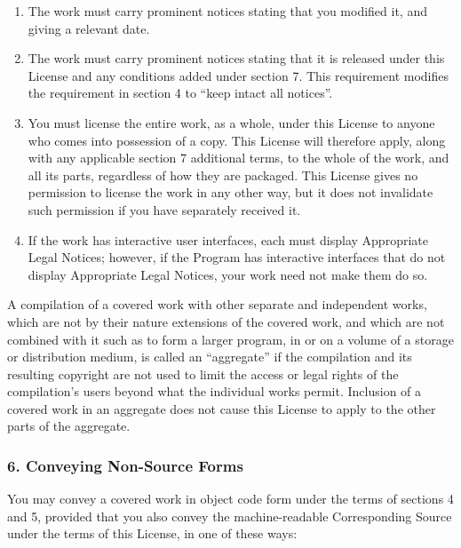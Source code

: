 \documentclass[a4paper, 11pt, twoside]{article}
\begin{document}
\begin{enumerate}[label=\Alph*)]
\item The work must carry prominent notices stating that you modified it, and giving a relevant date.
\item The work must carry prominent notices stating that it is released under this License and any conditions added under section 7. This requirement modifies the requirement in section 4 to “keep intact all notices”.
\item You must license the entire work, as a whole, under this License to anyone who comes into possession of a copy. This License will therefore apply, along with any applicable section 7 additional terms, to the whole of the work, and all its parts, regardless of how they are packaged. This License gives no permission to license the work in any other way, but it does not invalidate such permission if you have separately received it.
\item If the work has interactive user interfaces, each must display Appropriate Legal Notices; however, if the Program has interactive interfaces that do not display Appropriate Legal Notices, your work need not make them do so.
\end{enumerate}

A compilation of a covered work with other separate and independent works, which are not by their nature extensions of the covered work, and which are not combined with it such as to form a larger program, in or on a volume of a storage or distribution medium, is called an “aggregate” if the compilation and its resulting copyright are not used to limit the access or legal rights of the compilation's users beyond what the individual works permit. Inclusion of a covered work in an aggregate does not cause this License to apply to the other parts of the aggregate.

\subsubsection{6. Conveying Non-Source Forms}

You may convey a covered work in object code form under the terms of sections 4 and 5, provided that you also convey the machine-readable Corresponding Source under the terms of this License, in one of these ways:
\end{document}
